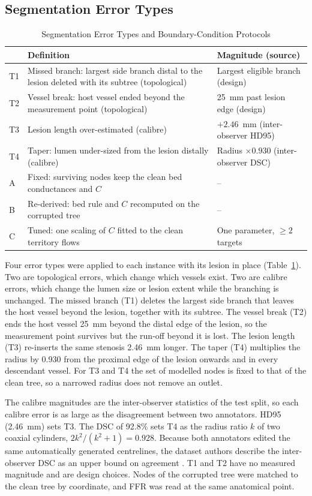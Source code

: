 \documentclass[journal]{IEEEtran}
\begin{document}
\subsection{Segmentation Error Types}
\begin{table}[!t]
\caption{Segmentation Error Types and Boundary-Condition Protocols}
\label{tab:design}
\centering\footnotesize
\begin{tabular}{@{}p{0.6cm}p{4.9cm}p{2.5cm}@{}}
\toprule
 & Definition & Magnitude (source)\\
\midrule
T1 & Missed branch: largest side branch distal to the lesion deleted with its subtree (topological) & Largest eligible branch (design)\\
T2 & Vessel break: host vessel ended beyond the measurement point (topological) & 25~mm past lesion edge (design)\\
T3 & Lesion length over-estimated (calibre) & $+2.46$~mm (inter-observer HD95)\\
T4 & Taper: lumen under-sized from the lesion distally (calibre) & Radius $\times 0.930$ (inter-observer DSC)\\
\midrule
A & Fixed: surviving nodes keep the clean bed conductances and $C$ & --\\
B & Re-derived: bed rule and $C$ recomputed on the corrupted tree & --\\
C & Tuned: one scaling of $C$ fitted to the clean territory flows & One parameter, $\geq 2$ targets\\
\bottomrule
\end{tabular}
\end{table}
Four error types were applied to each instance with its lesion in place (Table~\ref{tab:design}). Two are
topological errors, which change which vessels exist. Two are calibre errors, which change the lumen size or lesion
extent while the branching is unchanged. The missed branch (T1) deletes the largest side branch that leaves the host
vessel beyond the lesion, together with its subtree. The vessel break (T2) ends the host vessel 25~mm beyond the
distal edge of the lesion, so the measurement point survives but the run-off beyond it is lost. The lesion length
(T3) re-inserts the same stenosis 2.46~mm longer. The taper (T4) multiplies the radius by 0.930 from the proximal
edge of the lesion onwards and in every descendant vessel. For T3 and T4 the set of modelled nodes is fixed to that
of the clean tree, so a narrowed radius does not remove an outlet.

The calibre magnitudes are the inter-observer statistics of the test split, so each calibre error is as large as
the disagreement between two annotators. HD95 (2.46~mm) sets T3. The DSC of 92.8\% sets T4 as the radius
ratio $k$ of two coaxial cylinders, $2k^2/(k^2+1) = 0.928$. Because both annotators edited the same automatically
generated centrelines, the dataset authors describe the inter-observer DSC as an upper bound on agreement \cite{bransby2026}. T1 and T2 have
no measured magnitude and are design choices. Nodes of the corrupted tree were matched to the clean tree by
coordinate, and FFR was read at the same anatomical point.
\end{document}
